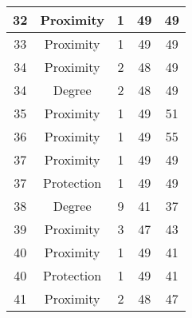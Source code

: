 \documentclass[results.tex]{subfiles}
\begin{document}
\begin{center}
\begin{tabular}{| c || c | c | c | c |}
            \hline
            32                      & Proximity                    & 1                      & 49                      & 49                   \\
            \hline
            33                      & Proximity                    & 1                      & 49                      & 49                   \\
            \hline
            34                      & Proximity                    & 2                      & 48                      & 49                   \\
            \hline
            34                      & Degree                       & 2                      & 48                      & 49                   \\
            \hline
            35                      & Proximity                    & 1                      & 49                      & 51                   \\
            \hline
            36                      & Proximity                    & 1                      & 49                      & 55                   \\
            \hline
            37                      & Proximity                    & 1                      & 49                      & 49                   \\
            \hline
            37                      & Protection                   & 1                      & 49                      & 49                   \\
            \hline
            38                      & Degree                       & 9                      & 41                      & 37                   \\
            \hline
            39                      & Proximity                    & 3                      & 47                      & 43                   \\
            \hline
            40                      & Proximity                    & 1                      & 49                      & 41                   \\
            \hline
            40                      & Protection                   & 1                      & 49                      & 41                   \\
            \hline
            41                      & Proximity                    & 2                      & 48                      & 47                   \\

\end{tabular}
\end{center}
\end{document}
